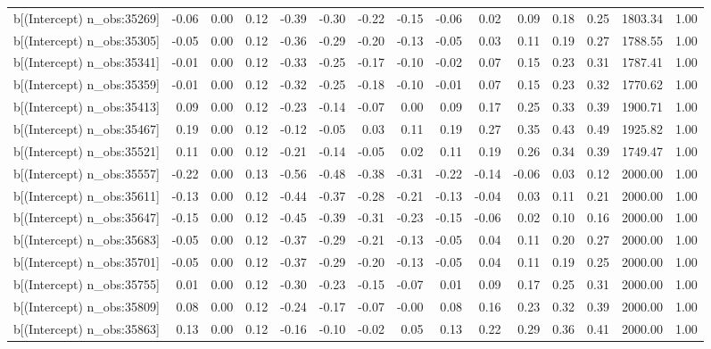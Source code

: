 \begin{table}[ht]
\begin{tabular}{rrrrrrrrrrrrrrr}
  b[(Intercept) n\_obs:35269] & -0.06 & 0.00 & 0.12 & -0.39 & -0.30 & -0.22 & -0.15 & -0.06 & 0.02 & 0.09 & 0.18 & 0.25 & 1803.34 & 1.00 \\ 
  b[(Intercept) n\_obs:35305] & -0.05 & 0.00 & 0.12 & -0.36 & -0.29 & -0.20 & -0.13 & -0.05 & 0.03 & 0.11 & 0.19 & 0.27 & 1788.55 & 1.00 \\ 
  b[(Intercept) n\_obs:35341] & -0.01 & 0.00 & 0.12 & -0.33 & -0.25 & -0.17 & -0.10 & -0.02 & 0.07 & 0.15 & 0.23 & 0.31 & 1787.41 & 1.00 \\ 
  b[(Intercept) n\_obs:35359] & -0.01 & 0.00 & 0.12 & -0.32 & -0.25 & -0.18 & -0.10 & -0.01 & 0.07 & 0.15 & 0.23 & 0.32 & 1770.62 & 1.00 \\ 
  b[(Intercept) n\_obs:35413] & 0.09 & 0.00 & 0.12 & -0.23 & -0.14 & -0.07 & 0.00 & 0.09 & 0.17 & 0.25 & 0.33 & 0.39 & 1900.71 & 1.00 \\ 
  b[(Intercept) n\_obs:35467] & 0.19 & 0.00 & 0.12 & -0.12 & -0.05 & 0.03 & 0.11 & 0.19 & 0.27 & 0.35 & 0.43 & 0.49 & 1925.82 & 1.00 \\ 
  b[(Intercept) n\_obs:35521] & 0.11 & 0.00 & 0.12 & -0.21 & -0.14 & -0.05 & 0.02 & 0.11 & 0.19 & 0.26 & 0.34 & 0.39 & 1749.47 & 1.00 \\ 
  b[(Intercept) n\_obs:35557] & -0.22 & 0.00 & 0.13 & -0.56 & -0.48 & -0.38 & -0.31 & -0.22 & -0.14 & -0.06 & 0.03 & 0.12 & 2000.00 & 1.00 \\ 
  b[(Intercept) n\_obs:35611] & -0.13 & 0.00 & 0.12 & -0.44 & -0.37 & -0.28 & -0.21 & -0.13 & -0.04 & 0.03 & 0.11 & 0.21 & 2000.00 & 1.00 \\ 
  b[(Intercept) n\_obs:35647] & -0.15 & 0.00 & 0.12 & -0.45 & -0.39 & -0.31 & -0.23 & -0.15 & -0.06 & 0.02 & 0.10 & 0.16 & 2000.00 & 1.00 \\ 
  b[(Intercept) n\_obs:35683] & -0.05 & 0.00 & 0.12 & -0.37 & -0.29 & -0.21 & -0.13 & -0.05 & 0.04 & 0.11 & 0.20 & 0.27 & 2000.00 & 1.00 \\ 
  b[(Intercept) n\_obs:35701] & -0.05 & 0.00 & 0.12 & -0.37 & -0.29 & -0.20 & -0.13 & -0.05 & 0.04 & 0.11 & 0.19 & 0.25 & 2000.00 & 1.00 \\ 
  b[(Intercept) n\_obs:35755] & 0.01 & 0.00 & 0.12 & -0.30 & -0.23 & -0.15 & -0.07 & 0.01 & 0.09 & 0.17 & 0.25 & 0.31 & 2000.00 & 1.00 \\ 
  b[(Intercept) n\_obs:35809] & 0.08 & 0.00 & 0.12 & -0.24 & -0.17 & -0.07 & -0.00 & 0.08 & 0.16 & 0.23 & 0.32 & 0.39 & 2000.00 & 1.00 \\ 
  b[(Intercept) n\_obs:35863] & 0.13 & 0.00 & 0.12 & -0.16 & -0.10 & -0.02 & 0.05 & 0.13 & 0.22 & 0.29 & 0.36 & 0.41 & 2000.00 & 1.00 \\ 

\end{tabular}
\end{table}
